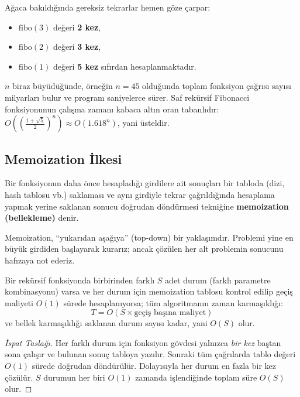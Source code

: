 Ağaca bakıldığında gereksiz tekrarlar hemen göze çarpar:
\begin{itemize}
    \item $\text{fibo}(3)$ değeri \textbf{2 kez},
    \item $\text{fibo}(2)$ değeri \textbf{3 kez},
    \item $\text{fibo}(1)$ değeri \textbf{5 kez} sıfırdan hesaplanmaktadır.
\end{itemize}

$n$ biraz büyüdüğünde, örneğin $n=45$ olduğunda toplam fonksiyon çağrısı sayısı milyarları bulur ve program saniyelerce sürer. Saf rekürsif Fibonacci fonksiyonunun çalışma zamanı kabaca altın oran tabanlıdır: $O\left(\left(\frac{1+\sqrt{5}}{2}\right)^n\right) \approx O(1.618^n)$, yani üsteldir.

\subsection{Memoization İlkesi}

\begin{definition}[Memoization]
Bir fonksiyonun daha önce hesapladığı girdilere ait sonuçları bir tabloda (dizi, hash tablosu vb.) saklaması ve aynı girdiyle tekrar çağrıldığında hesaplama yapmak yerine saklanan sonucu doğrudan döndürmesi tekniğine \textbf{memoization (bellekleme)} denir.
\end{definition}

Memoization, ``yukarıdan aşağıya'' (top-down) bir yaklaşımdır. Problemi yine en büyük girdiden başlayarak kurarız; ancak çözülen her alt problemin sonucunu hafızaya not ederiz.

\begin{theorem}
Bir rekürsif fonksiyonda birbirinden farklı $S$ adet durum (farklı parametre kombinasyonu) varsa ve her durum için memoization tablosu kontrol edilip geçiş maliyeti $O(1)$ sürede hesaplanıyorsa; tüm algoritmanın zaman karmaşıklığı:
\[
T = O(S \times \text{geçiş başına maliyet})
\]
ve bellek karmaşıklığı saklanan durum sayısı kadar, yani $O(S)$ olur.
\end{theorem}

\begin{proof}[İspat Taslağı]
Her farklı durum için fonksiyon gövdesi yalnızca \emph{bir kez} baştan sona çalışır ve bulunan sonuç tabloya yazılır. Sonraki tüm çağrılarda tablo değeri $O(1)$ sürede doğrudan döndürülür. Dolayısıyla her durum en fazla bir kez çözülür. $S$ durumun her biri $O(1)$ zamanda işlendiğinde toplam süre $O(S)$ olur.
\end{proof}

